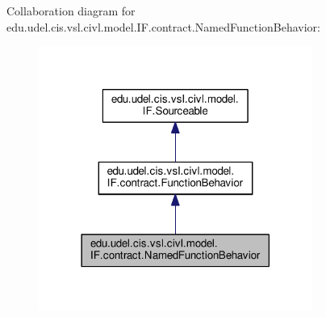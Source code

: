 Collaboration diagram for edu.\+udel.\+cis.\+vsl.\+civl.\+model.\+I\+F.\+contract.\+Named\+Function\+Behavior\+:
\nopagebreak
\begin{figure}[H]
\begin{center}
\leavevmode
\includegraphics[width=254pt]{interfaceedu_1_1udel_1_1cis_1_1vsl_1_1civl_1_1model_1_1IF_1_1contract_1_1NamedFunctionBehavior__coll__graph}
\end{center}
\end{figure}
